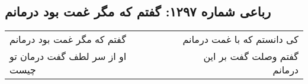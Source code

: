 \begin{center}
\section*{رباعی شماره ۱۲۹۷: گفتم که مگر غمت بود درمانم}
\label{sec:1297}
\begin{longtable}{l p{0.5cm} r}
گفتم که مگر غمت بود درمانم
&&
کی دانستم که با غمت درمانم
\\
او از سر لطف گفت درمان تو چیست
&&
گفتم وصلت گفت بر این درمانم
\\
\end{longtable}
\end{center}
